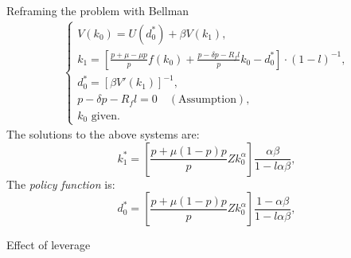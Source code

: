 \documentclass{beamer}
\begin{document}
\begin{frame}{Reframing the problem with Bellman}
     \begin{align*}
     \begin{cases}
         V(k_0) = U(d_0^*) + \beta V(k_1), \\
         k_1 = \left[ \frac{p + \mu - \mu p}{p}f(k_{0}) + \frac{p - \delta p - R_f l}{p} k_{0}  - d^*_0 \right] \cdot \left(1-l\right)^{-1}, \\
         d^*_0 = [\beta V'(k_{1})]^{-1},\\
         p - \delta p - R_f l=0 \quad (\text{Assumption}),\\
         k_0 \text{ given.}
     \end{cases}
 \end{align*}
The solutions to the above systems are:
\begin{equation}
    k^*_1 = \left[ \frac{p + \mu(1-p) p}{p}Z k_0^{\alpha}\right] \frac{\alpha\beta}{1-l\alpha\beta}, \label{eq29}
\end{equation}
The \textit{policy function} is:
\begin{equation}
    d^*_0 = \left[ \frac{p + \mu (1-p) p}{p}Z k_0^{\alpha}\right] \frac{1-\alpha\beta}{1-l\alpha\beta} \label{eq31},
\end{equation}

\end{frame}
\begin{frame}{Effect of leverage}
    \begin{figure}
    \centering
    \label{plot_part}
\end{figure}
\end{frame}
\end{document}
